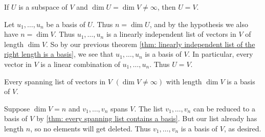 \begin{thm} 
  \label{thm: subspace of full dimension equals the whole space}
  If $U$ is a subspace of $V$ and $\dim U = \dim V \neq \infty$, then $U=V$.
\end{thm}
\begin{prf}
  Let $u_1, \ldots, u_n$ be a basis of $U$. Thus $n = \dim U$, and by the hypothesis we also have $n = \dim V$. Thus $u_1, \ldots, u_n$ is a linearly independent list of vectors in $V$ of length $\dim V$. So by our previous theorem \ref{thm: linearly independent list of the right length is a basis}, we see that $u_1, \ldots, u_n$ is a basis of $V$. In particular, every vector in $V$ is a linear combination of $u_1, \ldots, u_n$. Thus $U=V$.
\end{prf}

\setcounter{thm}{41}
\begin{thm} 
  \label{thm: spanning list of the right length}
  Every spanning list of vectors in $V$ $(\dim V \neq \infty)$ with length $\dim V$ is a basis of $V$.
\end{thm}
\begin{prf}
  Suppose $\dim V = n$ and $v_1, \ldots, v_n$ spans $V$. The list $v_1, \ldots, v_n$ can be reduced to a basis of $V$ by \ref{thm: every spanning list contains a basis}. But our list already has length $n$, so no elements will get deleted. Thus $v_1, \ldots, v_n$ is a basis of $V$, as desired.
\end{prf}

